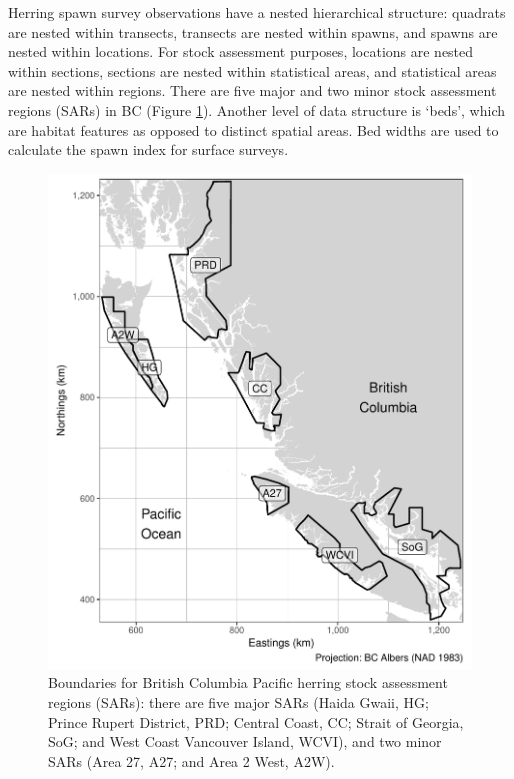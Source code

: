 \documentclass[12pt]{article}
\begin{document}
Herring spawn survey observations have a nested hierarchical structure: quadrats are nested within transects, transects are nested within spawns, and spawns are nested within locations.
For stock assessment purposes, locations are nested within sections, sections are nested within statistical areas, and statistical areas are nested within regions.
There are five major and two minor stock assessment regions (SARs) in BC (Figure \ref{figBC}).
Another level of data structure is `beds', which are habitat features as opposed to distinct spatial areas.
Bed widths are used to calculate the spawn index for surface surveys.

\begin{figure}
\centering
\includegraphics[width=\linewidth]{Figures/BC.pdf}
\caption[Boundaries for British Columbia Pacific herring stock assessment regions (SARs)]
{Boundaries for British Columbia Pacific herring stock assessment regions (SARs): there are five major SARs (Haida Gwaii, HG; Prince Rupert District, PRD; Central Coast, CC; Strait of Georgia, SoG; and West Coast Vancouver Island, WCVI), and two minor SARs (Area 27, A27; and Area 2 West, A2W).}
\label{figBC}
\end{figure}
\end{document}
